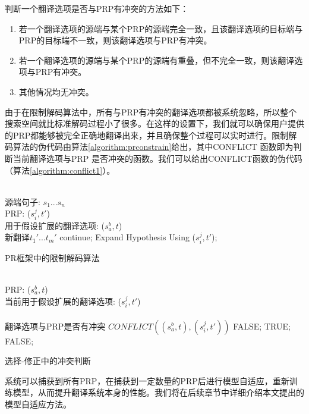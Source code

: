 \documentclass[master, winfont]{njuthesis}
\begin{document}
判断一个翻译选项是否与PRP有冲突的方法如下：
\begin{enumerate}
  \item 若一个翻译选项的源端与某个PRP的源端完全一致，且该翻译选项的目标端与PRP的目标端不一致，则该翻译选项与PRP有冲突。
  \item 若一个翻译选项的源端与某个PRP的源端有重叠，但不完全一致，则该翻译选项与PRP有冲突。
  \item 其他情况均无冲突。
\end{enumerate}

由于在限制解码算法中，所有与PRP有冲突的翻译选项都被系统忽略，所以整个搜索空间就比标准解码过程小了很多。在这样的设置下，我们就可以确保用户提供的PRP都能够被完全正确地翻译出来，并且确保整个过程可以实时进行。限制解码算法的伪代码由算法\ref{algorithm:prconstrain}给出，其中CONFLICT 函数即为判断当前翻译选项与PRP 是否冲突的函数。我们可以给出CONFLICT函数的伪代码（算法\ref{algorithm:conflict1}）。

\begin{algorithm}
\begin{algorithmic}[1]
\REQUIRE ~~ \\
源端句子: $s_1 ... s_n$\\
PRP: ($s_i^j, t'$)\\
用于假设扩展的翻译选项: ($s_a^b, t$)
\ENSURE ~~ \\
新翻译$t_1' ... t_m'$
    \STATE continue;
\ENDIF
\STATE Expand Hypothesis Using ($s_i^j, t'$);
\ENDWHILE
\end{algorithmic}
\caption{PR框架中的限制解码算法}
\label{algorithm:prconstrain}
\end{algorithm}

\begin{algorithm}
\begin{algorithmic}[1]
\REQUIRE ~~ \\
PRP: ($s_a^b, t$)\\
当前用于假设扩展的翻译选项: ($s_i^j, t'$)\\
\ENSURE~~\\
翻译选项与PRP是否有冲突
\STATE $CONFLICT((s_a^b, t) , (s_i^j, t'))$
        \RETURN FALSE;
    \ENDIF
    \RETURN TRUE;
\ENDIF
\RETURN FALSE;
\end{algorithmic}
\caption{选择-修正中的冲突判断}
\label{algorithm:conflict1}
\end{algorithm}

系统可以捕获到所有PRP，在捕获到一定数量的PRP后进行模型自适应，重新训练模型，从而提升翻译系统本身的性能。我们将在后续章节中详细介绍本文提出的模型自适应方法。
\end{document}
